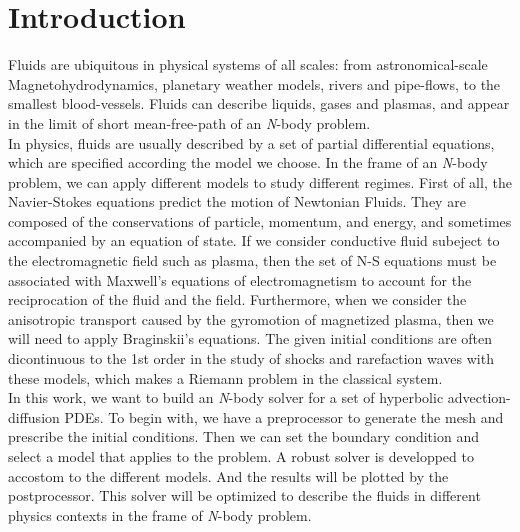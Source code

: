 \section{Introduction}

Fluids are ubiquitous in physical systems of all scales: from astronomical-scale Magnetohydrodynamics, planetary weather models, rivers and pipe-flows, to the smallest blood-vessels. Fluids can describe liquids, gases and plasmas, and appear in the limit of short mean-free-path of an \textit{N}-body problem.\\

In physics, fluids are usually described by a set of partial differential equations, which are specified according the model we choose. In the frame of an \textit{N}-body problem, we can apply different models to study different regimes. First of all, the Navier-Stokes equations predict the motion of Newtonian Fluids. They are composed of the conservations of particle, momentum, and energy, and sometimes accompanied by an equation of state. If we consider conductive fluid subeject to the electromagnetic field such as plasma, then the set of N-S equations must be associated with Maxwell's equations of electromagnetism to account for the reciprocation of the fluid and the field. Furthermore, when we consider the anisotropic transport caused by the gyromotion of magnetized plasma, then we will need to apply Braginskii's equations. The given initial conditions are often dicontinuous to the 1st order in the study of shocks and rarefaction waves with these models, which makes a Riemann problem in the classical system.\\

In this work, we want to build an \textit{N}-body solver for a set of hyperbolic advection-diffusion PDEs. To begin with, we have a preprocessor to generate the mesh and prescribe the initial conditions. Then we can set the boundary condition and select a model that applies to the problem. A robust solver is developped to accostom to the different models. And the results will be plotted by the postprocessor. This solver will be optimized to describe the fluids in different physics contexts in the frame of \textit{N}-body problem.\\
